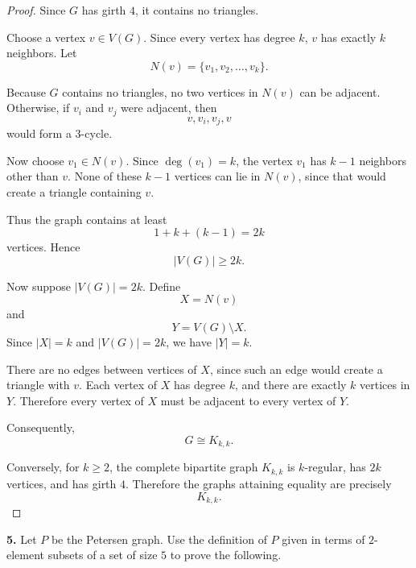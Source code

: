 \documentclass[12pt]{amsart}
\theoremstyle{conjecture}
\theoremstyle{definition}
\theoremstyle{question}
\theoremstyle{theorem}
\begin{document}
    \begin{proof}
        Since $G$ has girth $4$, it contains no triangles.

        Choose a vertex $v\in V(G)$. Since every vertex has degree $k$,
        $v$ has exactly $k$ neighbors. Let
        \[
            N(v)=\{v_1,v_2,\ldots,v_k\}.
        \]

        Because $G$ contains no triangles, no two vertices in $N(v)$ can
        be adjacent. Otherwise, if $v_i$ and $v_j$ were adjacent, then
        \[
            v,v_i,v_j,v
        \]
        would form a $3$-cycle.

        Now choose $v_1\in N(v)$. Since $\deg(v_1)=k$, the vertex $v_1$
        has $k-1$ neighbors other than $v$. None of these $k-1$ vertices
        can lie in $N(v)$, since that would create a triangle containing
        $v$.

        Thus the graph contains at least
        \[
            1+k+(k-1)=2k
        \]
        vertices. Hence
        \[
            |V(G)|\geq 2k.
        \]

        Now suppose $|V(G)|=2k$. Define
        \[
            X=N(v)
        \]
        and
        \[
            Y=V(G)\setminus X.
        \]
        Since $|X|=k$ and $|V(G)|=2k$, we have $|Y|=k$.

        There are no edges between vertices of $X$, since such an edge
        would create a triangle with $v$. Each vertex of $X$ has degree
        $k$, and there are exactly $k$ vertices in $Y$. Therefore every
        vertex of $X$ must be adjacent to every vertex of $Y$.

        Consequently,
        \[
            G\cong K_{k,k}.
        \]

        Conversely, for $k\geq 2$, the complete bipartite graph $K_{k,k}$
        is $k$-regular, has $2k$ vertices, and has girth $4$. Therefore
        the graphs attaining equality are precisely
        \[
            \boxed{K_{k,k}}.
        \]
    \end{proof}

    \textbf{5.} Let $P$ be the Petersen graph. Use the definition of $P$ given
    in terms of $2$-element subsets of a set of size $5$ to prove the
    following.
\end{document}

